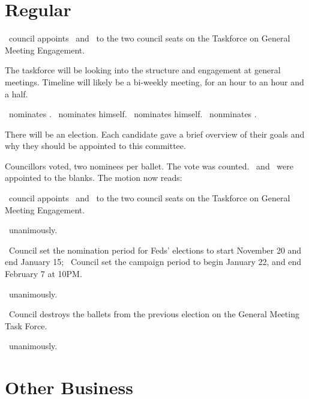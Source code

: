 \section*{Regular}
\begin{motion}
    \birt\ council appoints \blank\ and \blank\ to the two council seats on the
    Taskforce on General Meeting Engagement. 
    \movers{\antonio}{\brian}

    The taskforce will be looking into the structure and engagement at general
    meetings. Timeline will likely be a bi-weekly meeting, for an hour to an
    hour and a half.

    \alexander\ nominates \seneca. 
    \jason\ nominates himself.
    \alexander\ nominates himself.
    \andrewc\ nonminates \ben.

    There will be an election. Each candidate gave a brief overview of their
    goals and why they should be appointed to this committee.

    Councillors voted, two nominees per ballet.
    The vote was counted. \seneca\ and \ben\ were appointed to the blanks. 
    The motion now reads:

    \begin{motion}
        \birt\ council appoints \seneca\ and \ben\ to the two council seats
        on the Taskforce on General Meeting Engagement. 
    \end{motion}

    \carries\ unanimously.
\end{motion}

\begin{motion}
    \birt\ Council set the nomination period for Feds' elections to start 
    November 20 and end January 15; 
    \bifrt\ Council set the campaign period to begin January 22, and 
    end February 7 at 10PM.%
    \movers{\antonio}{\seneca}

    \carries\ unanimously.
\end{motion}

\begin{motion}
    \birt\ Council destroys the ballets from the previous election on the
    General Meeting Task Force. 
    \movers{\brian}{\jason}

    \carries\ unanimously.
\end{motion}

\section*{Other Business}

